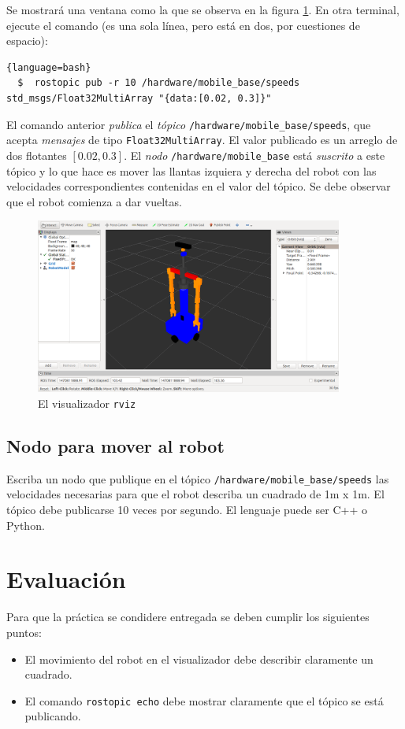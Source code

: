 \documentclass[a4paper,12pt]{article}
\begin{document}
Se mostrará una ventana como la que se observa en la figura \ref{fig:rviz}. En otra terminal, ejecute el comando (es una sola línea, pero está en dos, por cuestiones de espacio):
\begin{lstlisting}{language=bash}
  $  rostopic pub -r 10 /hardware/mobile_base/speeds std_msgs/Float32MultiArray "{data:[0.02, 0.3]}"
\end{lstlisting}

El comando anterior \textit{publica} el \textit{tópico} \texttt{/hardware/mobile\_base/speeds}, que acepta \textit{mensajes} de tipo \texttt{Float32MultiArray}. El valor publicado es un arreglo de dos flotantes $[0.02, 0.3]$. El \textit{nodo} \texttt{/hardware/mobile\_base} está \textit{suscrito} a este tópico y lo que hace es mover las llantas izquiera y derecha del robot con las velocidades correspondientes contenidas en el valor del tópico. Se debe observar que el robot comienza a dar vueltas. 

\begin{figure}
\centering
\includegraphics[width=0.9\textwidth]{rviz_initial.png}
\caption{El visualizador \texttt{rviz}}
\label{fig:rviz}
\end{figure}

\subsection{Nodo para mover al robot}
Escriba un nodo que publique en el tópico \texttt{/hardware/mobile\_base/speeds} las velocidades necesarias para que el robot describa un cuadrado de 1m x 1m. El tópico debe publicarse 10 veces por segundo. El lenguaje puede ser C++ o Python.

\section{Evaluación}
Para que la práctica se condidere entregada se deben cumplir los siguientes puntos:
\begin{itemize}
\item El movimiento del robot en el visualizador debe describir claramente un cuadrado.
\item El comando \texttt{rostopic echo} debe mostrar claramente que el tópico se está publicando.
\end{itemize}
\end{document}
